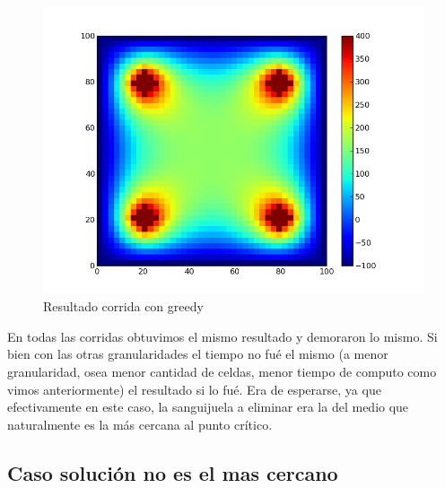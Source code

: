 \begin{figure}[htb]
\begin{center}
\includegraphics[scale=0.40]{imagenes/random_2.png} 
\caption{Resultado corrida con greedy} 
\end{center}
\end{figure}


En todas las corridas obtuvimos el mismo resultado y demoraron lo mismo. Si bien con las otras granularidades el tiempo no fué el mismo (a menor granularidad, osea menor cantidad de celdas,  menor tiempo de computo como vimos anteriormente) el resultado si lo fué. Era de esperarse, ya que efectivamente en este caso, la sanguijuela a eliminar era la del medio que naturalmente es la más cercana al punto crítico.
\newpage

\subsection{Caso solución no es el mas cercano}

